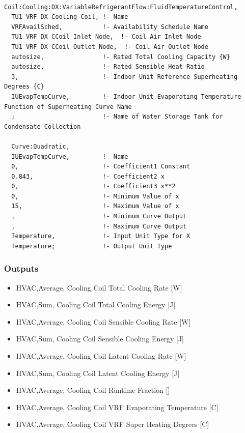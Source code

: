 \begin{lstlisting}

Coil:Cooling:DX:VariableRefrigerantFlow:FluidTemperatureControl,
  TU1 VRF DX Cooling Coil, !- Name
  VRFAvailSched,           !- Availability Schedule Name
  TU1 VRF DX CCoil Inlet Node,  !- Coil Air Inlet Node
  TU1 VRF DX CCoil Outlet Node,  !- Coil Air Outlet Node
  autosize,                !- Rated Total Cooling Capacity {W}
  autosize,                !- Rated Sensible Heat Ratio
  3,                       !- Indoor Unit Reference Superheating Degrees {C}    
  IUEvapTempCurve,         !- Indoor Unit Evaporating Temperature Function of Superheating Curve Name    
  ;                        !- Name of Water Storage Tank for Condensate Collection

  Curve:Quadratic,
  IUEvapTempCurve,         !- Name
  0,                       !- Coefficient1 Constant
  0.843,                   !- Coefficient2 x
  0,                       !- Coefficient3 x**2
  0,                       !- Minimum Value of x    
  15,                      !- Maximum Value of x    
  ,                        !- Minimum Curve Output
  ,                        !- Maximum Curve Output
  Temperature,             !- Input Unit Type for X
  Temperature;             !- Output Unit Type
\end{lstlisting}

\subsubsection{Outputs}\label{outputs-7-003}

\begin{itemize}
\item
  HVAC,Average, Cooling Coil Total Cooling Rate {[}W{]}
\item
  HVAC,Sum, Cooling Coil Total Cooling Energy {[}J{]}
\item
  HVAC,Average, Cooling Coil Sensible Cooling Rate {[}W{]}
\item
  HVAC,Sum, Cooling Coil Sensible Cooling Energy {[}J{]}
\item
  HVAC,Average, Cooling Coil Latent Cooling Rate {[}W{]}
\item
  HVAC,Sum, Cooling Coil Latent Cooling Energy {[}J{]}
\item
  HVAC,Average, Cooling Coil Runtime Fraction {[]}
\item
  HVAC,Average, Cooling Coil VRF Evaporating Temperature {[}C{]}
\item
  HVAC,Average, Cooling Coil VRF Super Heating Degrees {[}C{]}
\end{itemize}

